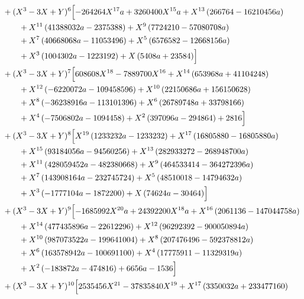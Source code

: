 \begin{align*}
&{}+(X^3-3X+Y)^{6}\Bigl[- 264264 X^{17} a + 3260400 X^{15} a + X^{13} \left(266764 - 16210456 a\right)\\
&\qquad + X^{11} \left(41388032 a - 2375388\right) + X^{9} \left(7724210 - 57080708 a\right)\\
&\qquad + X^{7} \left(40668068 a - 11053496\right) + X^{5} \left(6576582 - 12668156 a\right)\\
&\qquad + X^{3} \left(1004302 a - 1223192\right) + X \left(5408 a + 23584\right)\Bigr]\\
&{}+(X^3-3X+Y)^{7}\Bigl[608608 X^{18} - 7889700 X^{16} + X^{14} \left(653968 a + 41104248\right)\\
&\qquad + X^{12} \left(- 6220072 a - 109458596\right) + X^{10} \left(22150686 a + 156150628\right)\\
&\qquad + X^{8} \left(- 36238916 a - 113101396\right) + X^{6} \left(26789748 a + 33798166\right)\\
&\qquad + X^{4} \left(- 7506802 a - 1094458\right) + X^{2} \left(397096 a - 294864\right) + 2816\Bigr]\\
&{}+(X^3-3X+Y)^{8}\Bigl[X^{19} \left(1233232 a - 1233232\right) + X^{17} \left(16805880 - 16805880 a\right)\\
&\qquad + X^{15} \left(93184056 a - 94560256\right) + X^{13} \left(282933272 - 268948700 a\right)\\
&\qquad + X^{11} \left(428059452 a - 482380668\right) + X^{9} \left(464533414 - 364272396 a\right)\\
&\qquad + X^{7} \left(143908164 a - 232745724\right) + X^{5} \left(48510018 - 14794632 a\right)\\
&\qquad + X^{3} \left(- 1777104 a - 1872200\right) + X \left(74624 a - 30464\right)\Bigr]\\
&{}+(X^3-3X+Y)^{9}\Bigl[- 1685992 X^{20} a + 24392200 X^{18} a + X^{16} \left(2061136 - 147044758 a\right)\\
&\qquad + X^{14} \left(477435896 a - 22612296\right) + X^{12} \left(96292392 - 900050894 a\right)\\
&\qquad + X^{10} \left(987073522 a - 199641004\right) + X^{8} \left(207476496 - 592378812 a\right)\\
&\qquad + X^{6} \left(163578942 a - 100691100\right) + X^{4} \left(17775911 - 11329319 a\right)\\
&\qquad + X^{2} \left(- 183872 a - 474816\right) + 6656 a - 1536\Bigr]\\
&{}+(X^3-3X+Y)^{10}\Bigl[2535456 X^{21} - 37835840 X^{19} + X^{17} \left(3350032 a + 233477160\right)\\

\end{align*}
